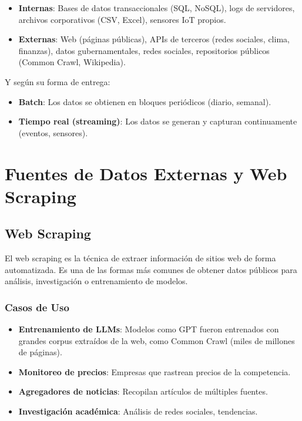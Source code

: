 \documentclass[12pt,a4paper,openany,oneside]{book}
\begin{document}
\begin{itemize}
    \item \textbf{Internas}: Bases de datos transaccionales (SQL, NoSQL), logs de servidores, archivos corporativos (CSV, Excel), sensores IoT propios.
    \item \textbf{Externas}: Web (páginas públicas), APIs de terceros (redes sociales, clima, finanzas), datos gubernamentales, redes sociales, repositorios públicos (Common Crawl, Wikipedia).
\end{itemize}

Y según su forma de entrega:
\begin{itemize}
    \item \textbf{Batch}: Los datos se obtienen en bloques periódicos (diario, semanal).
    \item \textbf{Tiempo real (streaming)}: Los datos se generan y capturan continuamente (eventos, sensores).
\end{itemize}

\chapter{Fuentes de Datos Externas y Web Scraping}
\section{Web Scraping}
El web scraping es la técnica de extraer información de sitios web de forma automatizada. Es una de las formas más comunes de obtener datos públicos para análisis, investigación o entrenamiento de modelos.

\subsection{Casos de Uso}
\begin{itemize}
    \item \textbf{Entrenamiento de LLMs}: Modelos como GPT fueron entrenados con grandes corpus extraídos de la web, como Common Crawl (miles de millones de páginas).
    \item \textbf{Monitoreo de precios}: Empresas que rastrean precios de la competencia.
    \item \textbf{Agregadores de noticias}: Recopilan artículos de múltiples fuentes.
    \item \textbf{Investigación académica}: Análisis de redes sociales, tendencias.
\end{itemize}
\end{document}
